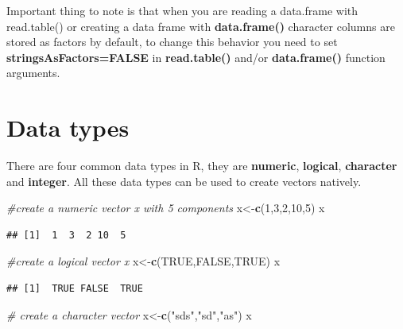 \documentclass[12pt,]{krantz}
\newenvironment{Shaded}{\begin{snugshade}}{\end{snugshade}}
\newcommand{\CommentTok}[1]{\textcolor[rgb]{0.56,0.35,0.01}{\textit{#1}}}
\newcommand{\DecValTok}[1]{\textcolor[rgb]{0.00,0.00,0.81}{#1}}
\newcommand{\KeywordTok}[1]{\textcolor[rgb]{0.13,0.29,0.53}{\textbf{#1}}}
\newcommand{\NormalTok}[1]{#1}
\newcommand{\OtherTok}[1]{\textcolor[rgb]{0.56,0.35,0.01}{#1}}
\newcommand{\StringTok}[1]{\textcolor[rgb]{0.31,0.60,0.02}{#1}}
\begin{document}
Important thing to note is that when you are reading a data.frame with read.table() or creating a data frame with \textbf{data.frame()} character columns are stored as factors by default, to change this behavior you need to set \textbf{stringsAsFactors=FALSE} in \textbf{read.table()} and/or \textbf{data.frame()} function arguments.

\hypertarget{data-types}{%
\section{Data types}\label{data-types}}

There are four common data types in R, they are \textbf{numeric}, \textbf{logical}, \textbf{character} and \textbf{integer}. All these data types can be used to create vectors natively.

\begin{Shaded}
\begin{Highlighting}[]
\CommentTok{#create a numeric vector x with 5 components}
\NormalTok{x<-}\KeywordTok{c}\NormalTok{(}\DecValTok{1}\NormalTok{,}\DecValTok{3}\NormalTok{,}\DecValTok{2}\NormalTok{,}\DecValTok{10}\NormalTok{,}\DecValTok{5}\NormalTok{)}
\NormalTok{x}
\end{Highlighting}
\end{Shaded}

\begin{verbatim}
## [1]  1  3  2 10  5
\end{verbatim}

\begin{Shaded}
\begin{Highlighting}[]
\CommentTok{#create a logical vector x}
\NormalTok{x<-}\KeywordTok{c}\NormalTok{(}\OtherTok{TRUE}\NormalTok{,}\OtherTok{FALSE}\NormalTok{,}\OtherTok{TRUE}\NormalTok{)}
\NormalTok{x}
\end{Highlighting}
\end{Shaded}

\begin{verbatim}
## [1]  TRUE FALSE  TRUE
\end{verbatim}

\begin{Shaded}
\begin{Highlighting}[]
\CommentTok{# create a character vector}
\NormalTok{x<-}\KeywordTok{c}\NormalTok{(}\StringTok{"sds"}\NormalTok{,}\StringTok{"sd"}\NormalTok{,}\StringTok{"as"}\NormalTok{)}
\NormalTok{x}
\end{Highlighting}
\end{Shaded}
\end{document}
